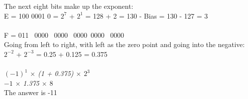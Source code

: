 \documentclass[11pt]{article}
\begin{document}
\begin{itemize}
\begin{itemize}
{{{         The next eight bits make up the exponent: \\
         E = 100 0001 0 = $2^7$ + $2^1$ = 128 + 2 = 130 - Bias = 130 - 127 = 3\\
         \\
         F = 011 \ 0000 \ 0000 \ 0000\ 0000 \ 0000\\
         Going from left to right, with left as the zero point and going into the negative:\\
         $2^{-2}$ + $2^{-3}$ = 0.25 + 0.125 = 0.375\\
         \\
         \textsl{$(-1)^1$ $\times$ (1 + 0.375) $\times$ $2^3$}\\
          \textsl{$-1$ $\times$ 1.375 $\times$ $8$}\\
          The answer is -11
       }}
    }
 \end{itemize}
\end{itemize}


\end{document}
